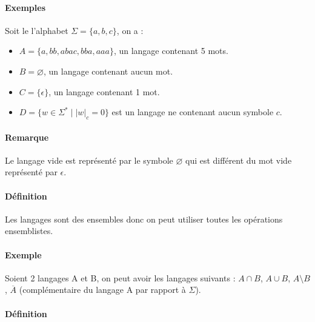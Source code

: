 

\paragraph{Exemples} %
\label{par:exemples}

Soit le l'alphabet $\Sigma=\{a,b,c\}$, on a :

\begin{itemize}
	\item $A=\{a,bb,abac,bba,aaa\}$, un langage contenant 5 mots.
	\item $B=\varnothing$, un langage contenant aucun mot.
	\item $C=\{\epsilon\}$, un langage contenant 1 mot.
	\item $D=\{w \in \Sigma^* \mid \left|w\right|_c=0\}$ est un langage ne contenant aucun symbole $c$.
\end{itemize}



\paragraph{Remarque} %
\label{par:remarque}

Le langage vide est représenté par le symbole $\varnothing$ qui est différent du mot vide représenté par $\epsilon$.



\paragraph{Définition} %
\label{par:d_finition}

Les langages sont des ensembles donc on peut utiliser toutes les opérations ensemblistes.



\paragraph{Exemple} %
\label{par:exemple}

Soient 2 langages A et B, on peut avoir les langages suivants : $A \cap B$, $A \cup B$, $A \setminus B$, $\overline{A}$ (complémentaire du langage A par rapport à $\Sigma$).



\paragraph{Définition} %
\label{par:d_finition}

